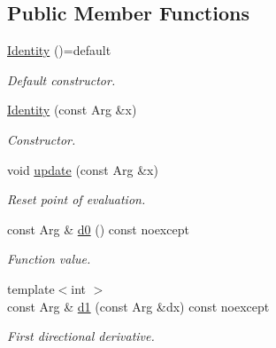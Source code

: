 \subsection*{Public Member Functions}
\begin{DoxyCompactItemize}
\item 
\hypertarget{structFunG_1_1Identity_a2480f818e33371734d328558f71248ec}{\hyperlink{structFunG_1_1Identity_a2480f818e33371734d328558f71248ec}{Identity} ()=default}\label{structFunG_1_1Identity_a2480f818e33371734d328558f71248ec}

\begin{DoxyCompactList}\small\item\em Default constructor. \end{DoxyCompactList}\item 
\hyperlink{structFunG_1_1Identity_a080e9bf064c469a5141765f3ee0416b0}{Identity} (const Arg \&x)
\begin{DoxyCompactList}\small\item\em Constructor. \end{DoxyCompactList}\item 
\hypertarget{structFunG_1_1Identity_acceedd6198948c7e1eb782f7a358a759}{void \hyperlink{structFunG_1_1Identity_acceedd6198948c7e1eb782f7a358a759}{update} (const Arg \&x)}\label{structFunG_1_1Identity_acceedd6198948c7e1eb782f7a358a759}

\begin{DoxyCompactList}\small\item\em Reset point of evaluation. \end{DoxyCompactList}\item 
\hypertarget{structFunG_1_1Identity_ab1edf393c23ed1bef1d3d84c28289e36}{const Arg \& \hyperlink{structFunG_1_1Identity_ab1edf393c23ed1bef1d3d84c28289e36}{d0} () const noexcept}\label{structFunG_1_1Identity_ab1edf393c23ed1bef1d3d84c28289e36}

\begin{DoxyCompactList}\small\item\em Function value. \end{DoxyCompactList}\item 
\hypertarget{structFunG_1_1Identity_a9f22755ffd38fa5712446c0120deea21}{{\footnotesize template$<$int $>$ }\\const Arg \& \hyperlink{structFunG_1_1Identity_a9f22755ffd38fa5712446c0120deea21}{d1} (const Arg \&dx) const noexcept}\label{structFunG_1_1Identity_a9f22755ffd38fa5712446c0120deea21}

\begin{DoxyCompactList}\small\item\em First directional derivative. \end{DoxyCompactList}\end{DoxyCompactItemize}


